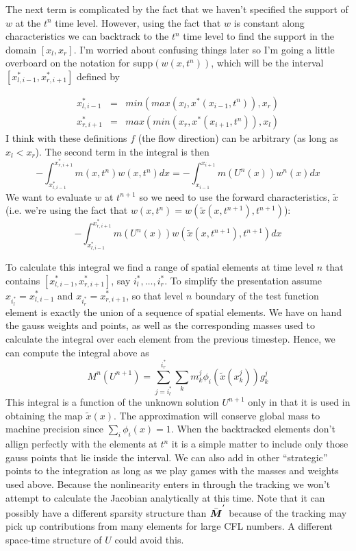 \documentclass[10pt,dvips,twoside,reqno]{amsart}
\begin{document}
The next term is complicated by the fact that we haven't specified the
support of $w$ at the $t^n$ time level. However, using the fact that
$w$ is constant along characteristics we can backtrack to the $t^n$
time level to find the support in the domain $[x_l,x_r]$. I'm worried
about confusing things later so I'm going a little overboard on the
notation for supp$(w(x,t^n))$, which will be the interval
$[x^*_{l,i-1},x^*_{r,i+1}]$ defined by

\begin{eqnarray}
x^*_{l,i-1} &=& min(max(x_l,x^*(x_{i-1},t^n)),x_r) \\
x^*_{r,i+1} &=& max(min(x_r,x^*(x_{i+1},t^n)),x_l) 
\end{eqnarray} 
I think with these definitions $f$ (the flow direction) can be arbitrary (as long as $x_l <
x_r$). The second term in the integral is then
\begin{equation}
-\int_{x^*_{l,i-1}}^{x^*_{r,i+1}}m(x,t^{n})w(x,t^{n}) dx = - \int_{x_{i-1}}^{x_{i+1}} m(U^{n}(x)) w^{n}(x) dx
\end{equation} 
We want to evaluate $w$ at $t^{n+1}$ so we need to use the forward
characteristics, $\tilde{x}$ (i.e. we're using the fact that $w(x,t^n)
= w(\tilde{x}(x,t^{n+1}),t^{n+1})$):
\begin{equation}
-\int_{x^*_{l,i-1}}^{x^*_{r,i+1}}m(U^{n}(x))w(\tilde{x}(x,t^{n+1}),t^{n+1}) dx 
\end{equation} 

To calculate this integral we find a range of spatial elements at time level $n$ that contains
$[x^*_{l,i-1},x^*_{r,i+1}]$, say $i^*_l,\ldots,i^*_r$.  To simplify the presentation assume
$x_{i^*_l} = x^*_{l,i-1}$ and $x_{i^*_r} = x^*_{r,i+1}$, so that level $n$ boundary of the test function element is exactly the union of a sequence of spatial elements. We have on
hand the gauss weights and points, as well as the corresponding masses
used to calculate the integral over each element from the previous
timestep. Hence, we can compute the integral above as
\begin{equation}
M^{n}(U^{n+1}) = \sum_{j=i^*_l}^{i^*_r} \sum_k m^j_k \phi_i(\tilde{x}(x^j_k)) g^j_k
\end{equation} 
This integral is a function of the unknown solution $U^{n+1}$ only in
that it is used in obtaining the map $\tilde{x}(x)$. The approximation
will conserve global mass to machine precision since $\sum_i \phi_i(x)
= 1$. When the backtracked elements don't allign perfectly with the
elements at $t^n$ it is a simple matter to include only those gauss
points that lie inside the interval. We can also add in other
``strategic'' points to the integration as long as we play games with
the masses and weights used above. Because the nonlinearity enters in
through the tracking we won't attempt to calculate the Jacobian
analytically at this time. Note that it can possibly have a different
sparsity structure than $\bar{\mbox{{\boldmath ${M}$}}}^{'}$ because of the tracking may pick
up contributions from many elements for large CFL numbers. A different
space-time structure of $U$ could avoid this.
\end{document}
